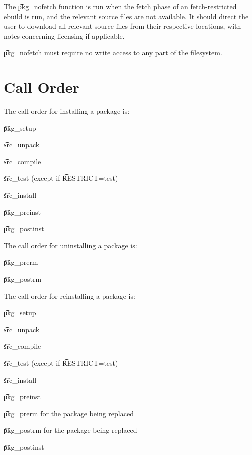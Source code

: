 The \t{pkg\_nofetch} function is run when the fetch phase of an fetch-restricted ebuild is run, and
the relevant source files are not available. It should direct the user to download all relevant
source files from their respective locations, with notes concerning licensing if applicable.

\t{pkg\_nofetch} must require no write access to any part of the filesystem.

\section{Call Order}

The call order for installing a package is:

\begin{compactitem}
\item \t{pkg\_setup}
\item \t{src\_unpack}
\item \t{src\_compile}
\item \t{src\_test} (except if \t{RESTRICT=test})
\item \t{src\_install}
\item \t{pkg\_preinst}
\item \t{pkg\_postinst}
\end{compactitem}

The call order for uninstalling a package is:

\begin{compactitem}
\item \t{pkg\_prerm}
\item \t{pkg\_postrm}
\end{compactitem}

The call order for reinstalling a package is:

\begin{compactitem}
\item \t{pkg\_setup}
\item \t{src\_unpack}
\item \t{src\_compile}
\item \t{src\_test} (except if \t{RESTRICT=test})
\item \t{src\_install}
\item \t{pkg\_preinst}
\item \t{pkg\_prerm} for the package being replaced
\item \t{pkg\_postrm} for the package being replaced
\item \t{pkg\_postinst}
\end{compactitem}

